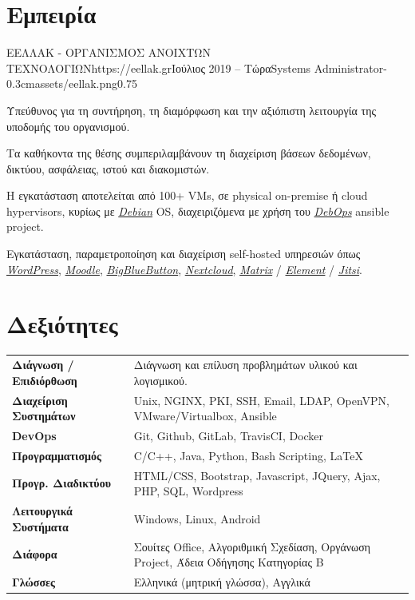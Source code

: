 \documentclass{mycv}
\begin{document}
	\section{Εμπειρία}

	\begin{EntryDatedLogo}{ΕΕΛΛΑΚ - ΟΡΓΑΝΙΣΜΟΣ ΑΝΟΙΧΤΩΝ ΤΕΧΝΟΛΟΓΙΩΝ}{https://eellak.gr}{Ιούλιος 2019 -- Τώρα}{Systems Administrator}{-0.3cm}{assets/eellak.png}{0.75}
		\begin{Itemize}
			\item Υπεύθυνος για τη συντήρηση, τη διαμόρφωση και την αξιόπιστη λειτουργία της υποδομής του οργανισμού.
			\item Τα καθήκοντα της θέσης συμπεριλαμβάνουν τη διαχείριση βάσεων δεδομένων, δικτύου, ασφάλειας, ιστού και διακομιστών.
			\item Η εγκατάσταση αποτελείται από 100+ VMs, σε physical on-premise ή cloud hypervisors, κυρίως με \href{https://www.debian.org}{\textit{Debian}} OS, διαχειριζόμενα με χρήση του \href{https://debops.org}{\textit{DebOps}} ansible project.
			\item Εγκατάσταση, παραμετροποίηση και διαχείριση self-hosted υπηρεσιών όπως \href{https://wordpress.com}{\textit{WordPress}}, \href{https://moodle.org}{\textit{Moodle}}, \href{https://bigbluebutton.org}{\textit{BigBlueButton}}, \href{https://nextcloud.com}{\textit{Nextcloud}}, \href{https://matrix.org}{\textit{Matrix}} / \href{https://element.io}{\textit{Element}} / \href{https://jitsi.org}{\textit{Jitsi}}.
		\end{Itemize}
	\end{EntryDatedLogo}

	\section{Δεξιότητες}
	\begin{tabular}{m{4.5cm} m{12.5cm}}
		\textbf{Διάγνωση / Επιδιόρθωση}     & Διάγνωση και επίλυση προβλημάτων υλικού και λογισμικού. \\
		\textbf{Διαχείριση Συστημάτων}		& Unix, NGINX, PKI, SSH, Email, LDAP, OpenVPN, VMware/Virtualbox, Ansible \\
		\textbf{DevOps}	                    & Git, Github, GitLab, TravisCI, Docker \\
		\textbf{Προγραμματισμός} 	 	  	& C/C++, Java, Python, Bash Scripting, \LaTeX \\
		\textbf{Προγρ. Διαδικτύου}	  		& HTML/CSS, Bootstrap, Javascript, JQuery, Ajax, PHP, SQL, Wordpress \\
		\textbf{Λειτουργικά Συστήματα}   	& Windows, Linux, Android \\
		\textbf{Διάφορα}        		 	& Σουίτες Office, Αλγοριθμική Σχεδίαση, Οργάνωση Project, Άδεια Οδήγησης Κατηγορίας Β \\
		\textbf{Γλώσσες} 			   		& Ελληνικά (μητρική γλώσσα), Αγγλικά 
	\end{tabular}
\end{document}
